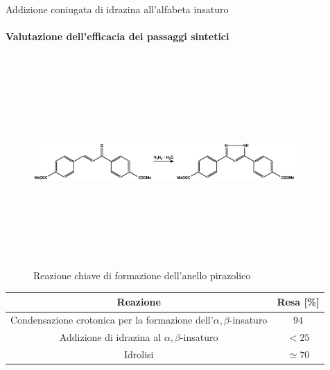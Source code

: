\documentclass{beamer}
\begin{document}
\begin{frame}{Addizione coniugata di idrazina all'alfabeta insaturo}
	\framesubtitle{Valutazione dell'efficacia dei passaggi sintetici}
	\begin{figure}[h]
		\centering
		\includegraphics[width=10cm,height=8cm,keepaspectratio]{../Structures/pyrazole-form-alt.eps}
		\caption{Reazione chiave di formazione dell'anello pirazolico}
	\end{figure}
	\begin{footnotesize}
		\begin{center}
			\begin{tabular}{cc}
				\toprule
				{Reazione}                                                                & Resa [\%]     \\
				\midrule
				Condensazione crotonica per la formazione dell'\(\alpha,\beta \)-insaturo & \(94\)        \\
				Addizione di idrazina al \(\alpha,\beta \)-insaturo                       & \(< 25\)      \\
				Idrolisi                                                                  & \(\simeq 70\) \\
				\bottomrule
			\end{tabular}
		\end{center}
	\end{footnotesize}
\end{frame}
\end{document}
